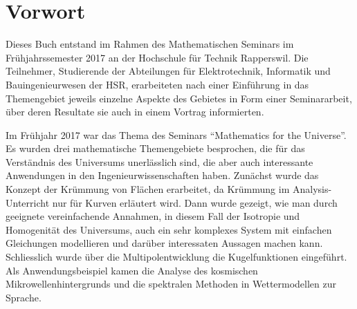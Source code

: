 %
%
%
\chapter*{Vorwort}
\rhead{}
Dieses Buch entstand im Rahmen des Mathematischen Seminars
im Frühjahrssemester 2017 an der Hochschule für Technik Rapperswil.
Die Teilnehmer, Studierende der Abteilungen für Elektrotechnik,
Informatik und Bauingenieurwesen der
HSR, erarbeiteten nach einer Einführung in das Themengebiet jeweils
einzelne Aspekte des Gebietes in Form einer Seminararbeit, über
deren Resultate sie auch in einem Vortrag informierten. 

Im Frühjahr 2017 war das Thema des Seminars ``Mathematics for
the Universe''.
Es wurden drei mathematische Themengebiete besprochen, die für
das Verständnis des Universums unerlässlich sind, die aber auch
interessante Anwendungen in den Ingenieurwissenschaften haben.
Zunächst wurde das Konzept der Krümmung von Flächen erarbeitet,
da Krümmung im Analysis-Unterricht nur für Kurven erläutert wird.
Dann wurde gezeigt, wie man durch geeignete vereinfachende Annahmen,
in diesem Fall der Isotropie und Homogenität des Universums, auch
ein sehr komplexes System mit einfachen Gleichungen modellieren
und darüber interessaten Aussagen machen kann.
Schliesslich wurde über die Multipolentwicklung die Kugelfunktionen
eingeführt.
Als Anwendungsbeispiel kamen die Analyse des kosmischen Mikrowellenhintergrunds
und die spektralen Methoden in Wettermodellen zur Sprache.

%
%
%

